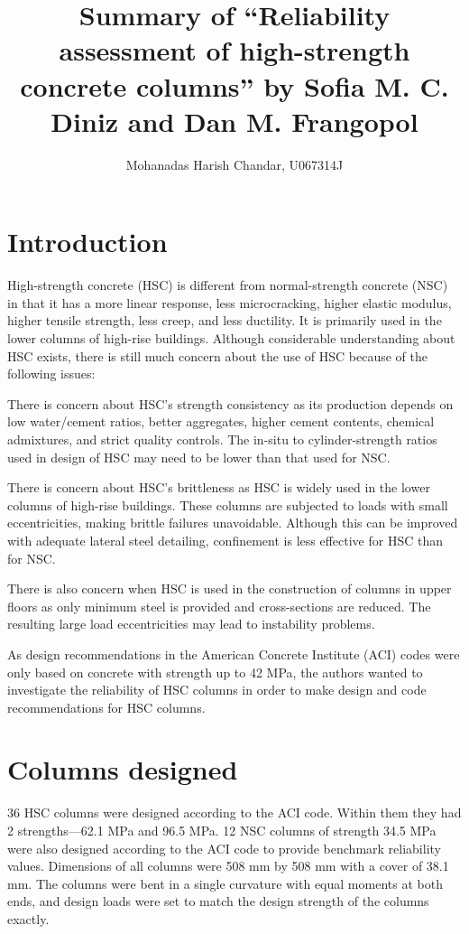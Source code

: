 \documentclass[a4paper]{article}
\title{Summary of ``Reliability assessment of high-strength concrete columns''
       by Sofia M. C. Diniz and Dan M. Frangopol
      }
\author{Mohanadas Harish Chandar, U067314J}
\begin{document}
\maketitle

\section*{Introduction}
High-strength concrete (HSC) is different from normal-strength concrete (NSC)
in that it has a more linear response, less microcracking, higher elastic 
modulus, higher tensile strength, less creep, and less ductility.
It is primarily used in the lower columns of high-rise buildings.
Although considerable understanding about HSC exists, there is still 
much concern about the use of HSC because of the following issues:

There is concern about HSC's strength consistency as its production
depends on low water/cement ratios, better aggregates, higher cement
contents, chemical admixtures, and strict quality controls.
The in-situ to cylinder-strength ratios used in design of HSC may need
to be lower than that used for NSC.

There is concern about HSC's brittleness as HSC is widely used in the
lower columns of high-rise buildings. These columns are subjected to loads
with small eccentricities, making brittle failures unavoidable.
Although this can be improved with adequate lateral steel detailing,
confinement is less effective for HSC than for NSC.

There is also concern when HSC is used in the construction of columns in upper
floors as only minimum steel is provided and cross-sections are
reduced. The resulting large load eccentricities may lead to instability 
problems.

As design recommendations in the American Concrete Institute (ACI) codes
were only based on concrete with strength up to 42 MPa, the authors
wanted to investigate the reliability of HSC columns in order to make
design and code recommendations for HSC columns.


\section*{Columns designed}
36 HSC columns were designed according to the ACI code. Within them they had
2 strengths---62.1 MPa and 96.5 MPa. 12 NSC columns of strength 34.5 MPa
were also designed according to the ACI code to provide benchmark reliability
values.
Dimensions of all columns were 508 mm by 508 mm with a cover of 38.1 mm.
The columns were bent in a single curvature with equal moments at both ends, and
design loads were set to match the design strength of the columns exactly.
\end{document}

